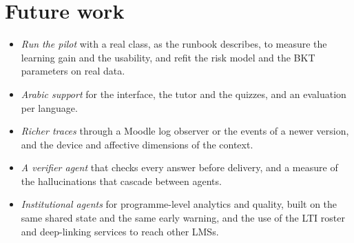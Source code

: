 \section*{Future work}

\begin{itemize}
  \item \emph{Run the pilot} with a real class, as the runbook describes,
        to measure the learning gain and the usability, and refit the
        risk model and the BKT parameters on real data.
  \item \emph{Arabic support} for the interface, the tutor and the
        quizzes, and an evaluation per language.
  \item \emph{Richer traces} through a Moodle log observer or the events
        of a newer version, and the device and affective dimensions of
        the context.
  \item \emph{A verifier agent} that checks every answer before delivery,
        and a measure of the hallucinations that cascade between agents.
  \item \emph{Institutional agents} for programme-level analytics and
        quality, built on the same shared state and the same early
        warning, and the use of the LTI roster and deep-linking services
        to reach other LMSs.
\end{itemize}
